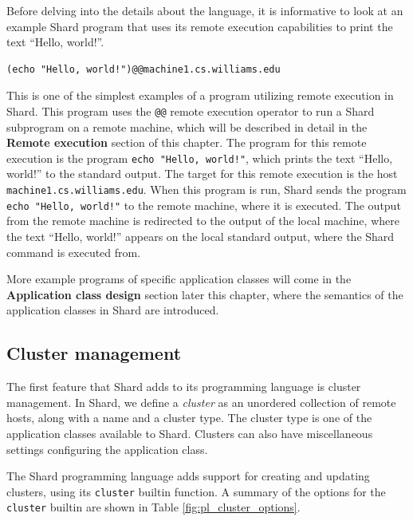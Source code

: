 \documentclass[twoside]{report}
\begin{document}
Before delving into the details about the language, it is informative to look at an example Shard program that uses its remote execution capabilities to print the text ``Hello, world!''.

\begin{minipage}[c]{\textwidth-15pt}
  \begin{lstlisting}[language=Shard]
(echo "Hello, world!")@@machine1.cs.williams.edu
\end{lstlisting}
  \smallskip
\end{minipage}

This is one of the simplest examples of a program utilizing remote execution in Shard.
This program uses the \texttt{@@} remote execution operator to run a Shard subprogram on a remote machine, which will be described in detail in the \textbf{Remote execution} section of this chapter.
The program for this remote execution is the program \texttt{echo "Hello, world!"}, which prints the text ``Hello, world!'' to the standard output.
The target for this remote execution is the host \texttt{machine1.cs.williams.edu}.
When this program is run, Shard sends the program \texttt{echo "Hello, world!"} to the remote machine, where it is executed.
The output from the remote machine is redirected to the output of the local machine, where the text ``Hello, world!'' appears on the local standard output, where the Shard command is executed from.

More example programs of specific application classes will come in the \textbf{Application class design} section later this chapter, where the semantics of the application classes in Shard are introduced.

\subsection{Cluster management}
The first feature that Shard adds to its programming language is cluster management.
In Shard, we define a \textit{cluster} as an unordered collection of remote hosts, along with a name and a cluster type.
The cluster type is one of the application classes available to Shard.
Clusters can also have miscellaneous settings configuring the application class.

The Shard programming language adds support for creating and updating clusters, using its \texttt{cluster} builtin function.
A summary of the options for the \texttt{cluster} builtin are shown in Table \ref{fig:pl_cluster_options}.
\end{document}
